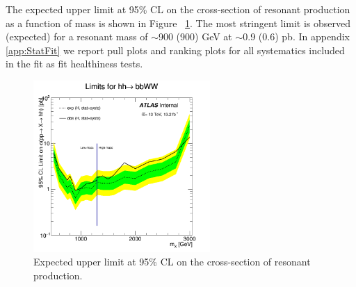 The expected upper limit at 95\% CL on the cross-section of
resonant production as a function of mass is shown in
Figure ~\ref{fig:finalLimit}. 
The most stringent limit is observed (expected) for a resonant mass of
$\sim$900 (900) GeV at $\sim$0.9 (0.6) pb. In appendix \ref{app:StatFit} we
report pull plots and ranking plots for all systematics included in
the fit as fit healthiness tests.


\begin{figure}[!h]
\begin{center}
\includegraphics*[width=0.60\textwidth] {chapters/dihiggs/figures/limit_observed_1300swap.png}
\caption[Expected upper limit at 95\% CL on the cross-section of resonant
production.]{Expected upper limit at 95\% CL on the cross-section of resonant
production.}
\label{fig:finalLimit}
\end{center}
\end{figure}


